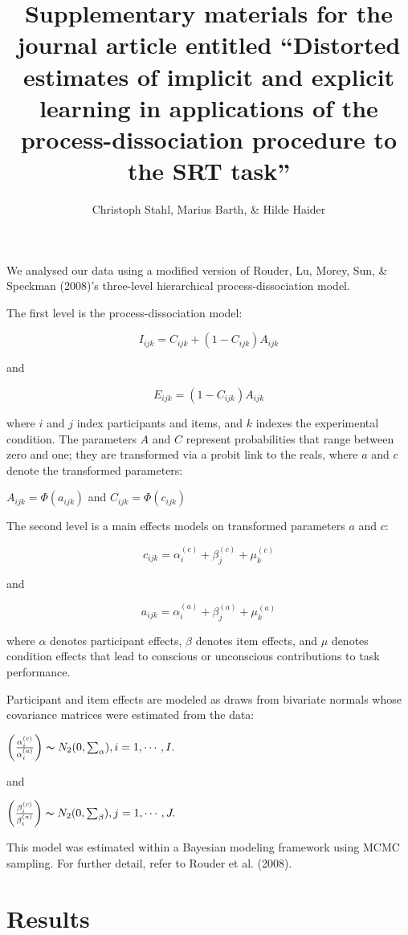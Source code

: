 \documentclass[american,floatsintext,doc]{apa6}
\title{Supplementary materials for the journal article entitled
\enquote{Distorted estimates of implicit and explicit learning in
applications of the process-dissociation procedure to the SRT task}}
\author{
          Christoph Stahl,
          Marius Barth,
          \& Hilde Haider  }
\affiliation{
    \vspace{0.5cm}
          \textsuperscript{} University of Cologne  }
\begin{document}
\maketitle



We analysed our data using a modified version of Rouder, Lu, Morey, Sun,
\& Speckman (2008)'s three-level hierarchical process-dissociation
model.

The first level is the process-dissociation model:

\[ I_{ijk} = C_{ijk} + (1-C_{ijk}) A_{ijk}\]

and

\[ E_{ijk} = (1-C_{ijk}) A_{ijk}\]

where \(i\) and \(j\) index participants and items, and \(k\) indexes
the experimental condition. The parameters \(A\) and \(C\) represent
probabilities that range between zero and one; they are transformed via
a probit link to the reals, where \(a\) and \(c\) denote the transformed
parameters:

\(A_{ijk} = \Phi(a_{ijk})\) and \(C_{ijk} = \Phi(c_{ijk})\)

The second level is a main effects models on transformed parameters
\(a\) and \(c\):

\[ c_{ijk} = \alpha_i^{(c)} + \beta_j^{(c)} + \mu_k^{(c)}\]

and

\[ a_{ijk} = \alpha_i^{(a)} + \beta_j^{(a)} + \mu_k^{(a)}\]

where \(\alpha\) denotes participant effects, \(\beta\) denotes item
effects, and \(\mu\) denotes condition effects that lead to conscious or
unconscious contributions to task performance.

Participant and item effects are modeled as draws from bivariate normals
whose covariance matrices were estimated from the data:

\(\left({\alpha_i^{(c)}}\over{\alpha_i^{(a)}} \right) \thicksim N_2(0, \sum_{\alpha}), i=1, \dotsb, I.\)

and

\(\left({\beta_i^{(c)}}\over{\beta_i^{(a)}} \right) \thicksim N_2(0, \sum_{\beta}), j=1, \dotsb, J.\)

This model was estimated within a Bayesian modeling framework using MCMC
sampling. For further detail, refer to Rouder et al. (2008).

\section{Results}\label{results}
\end{document}
